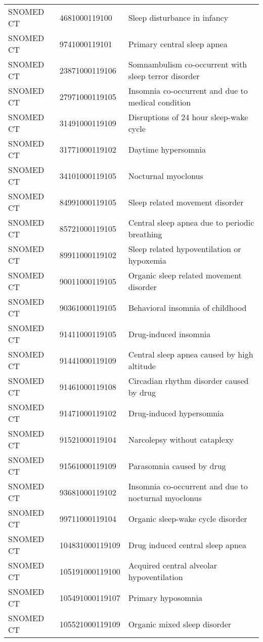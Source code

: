 \begin{longtable}{p{}p{}p{}}
  SNOMED CT & 4681000119100 & Sleep disturbance in infancy \\ 
  SNOMED CT & 9741000119101 & Primary central sleep apnea \\ 
  SNOMED CT & 23871000119106 & Somnambulism co-occurrent with sleep terror disorder \\ 
  SNOMED CT & 27971000119105 & Insomnia co-occurrent and due to medical condition \\ 
  SNOMED CT & 31491000119109 & Disruptions of 24 hour sleep-wake cycle \\ 
  SNOMED CT & 31771000119102 & Daytime hypersomnia \\ 
  SNOMED CT & 34101000119105 & Nocturnal myoclonus \\ 
  SNOMED CT & 84991000119105 & Sleep related movement disorder \\ 
  SNOMED CT & 85721000119105 & Central sleep apnea due to periodic breathing \\ 
  SNOMED CT & 89911000119102 & Sleep related hypoventilation or hypoxemia \\ 
  SNOMED CT & 90011000119105 & Organic sleep related movement disorder \\ 
  SNOMED CT & 90361000119105 & Behavioral insomnia of childhood \\ 
  SNOMED CT & 91411000119105 & Drug-induced insomnia \\ 
  SNOMED CT & 91441000119109 & Central sleep apnea caused by high altitude \\ 
  SNOMED CT & 91461000119108 & Circadian rhythm disorder caused by drug \\ 
  SNOMED CT & 91471000119102 & Drug-induced hypersomnia \\ 
  SNOMED CT & 91521000119104 & Narcolepsy without cataplexy \\ 
  SNOMED CT & 91561000119109 & Parasomnia caused by drug \\ 
  SNOMED CT & 93681000119102 & Insomnia co-occurrent and due to nocturnal myoclonus \\ 
  SNOMED CT & 99711000119104 & Organic sleep-wake cycle disorder \\ 
  SNOMED CT & 104831000119109 & Drug induced central sleep apnea \\ 
  SNOMED CT & 105191000119100 & Acquired central alveolar hypoventilation \\ 
  SNOMED CT & 105491000119107 & Primary hyposomnia \\ 
  SNOMED CT & 105521000119109 & Organic mixed sleep disorder \\ 

\end{longtable}
